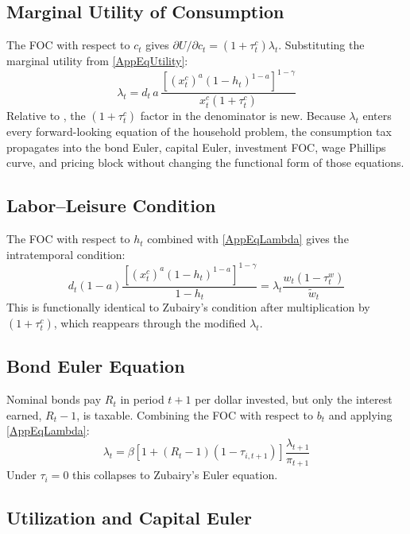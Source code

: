 \subsection{Marginal Utility of Consumption}

The FOC with respect to $c_t$ gives $\partial U/\partial c_t = (1+\tau_t^c)\lambda_t$. Substituting the marginal utility from \eqref{AppEqUtility}:
\begin{equation}\label{AppEqLambda}
    \lambda_t = d_t\, a\, \frac{\left[(x_t^c)^a (1-h_t)^{1-a}\right]^{1-\gamma}}{x_t^c (1+\tau_t^c)}
\end{equation}
Relative to , the $(1+\tau_t^c)$ factor in the denominator is new. Because $\lambda_t$ enters every forward-looking equation of the household problem, the consumption tax propagates into the bond Euler, capital Euler, investment FOC, wage Phillips curve, and pricing block without changing the functional form of those equations.

\subsection{Labor--Leisure Condition}

The FOC with respect to $h_t$ combined with \eqref{AppEqLambda} gives the intratemporal condition:
\begin{equation}\label{AppEqFOClabor}
    d_t (1-a) \frac{\left[(x_t^c)^a (1-h_t)^{1-a}\right]^{1-\gamma}}{1 - h_t}
    = \lambda_t \frac{w_t (1-\tau_t^w)}{\tilde w_t}
\end{equation}
This is functionally identical to Zubairy's condition after multiplication by $(1+\tau_t^c)$, which reappears through the modified $\lambda_t$.

\subsection{Bond Euler Equation}

Nominal bonds pay $R_t$ in period $t+1$ per dollar invested, but only the interest earned, $R_t - 1$, is taxable. Combining the FOC with respect to $b_t$ and applying \eqref{AppEqLambda}:
\begin{equation}\label{AppEqBondEuler}
    \lambda_t = \beta \left[1 + (R_t - 1)(1 - \tau_{i,t+1})\right] \frac{\lambda_{t+1}}{\pi_{t+1}}
\end{equation}
Under $\tau_i = 0$ this collapses to Zubairy's Euler equation.

\subsection{Utilization and Capital Euler}

